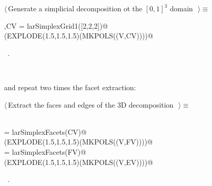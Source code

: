 \documentclass[11pt,oneside]{article}	%
\begin{document}
\begin{flushleft} \small
\begin{minipage}{\linewidth} \label{scrap14}
$\langle\,$Generate a simplicial decomposition ot the $[0,1]^3$ domain\nobreak\ {\footnotesize {}}$\,\rangle\equiv$
\vspace{-1ex}
\begin{list}{}{} \item
\mbox{}\verb@V,CV = larSimplexGrid1([2,2,2])@\\
\mbox{}\verb@VIEW(EXPLODE(1.5,1.5,1.5)(MKPOLS((V,CV))))@\\
\mbox{}\verb@@{\NWsep}
\end{list}
\vspace{-1ex}
\footnotesize\addtolength{\baselineskip}{-1ex}
\begin{list}{}{\setlength{\itemsep}{-\parsep}\setlength{\itemindent}{-\leftmargin}}
\item \NWtxtMacroRefIn\ .
\end{list}
\end{minipage}\\[4ex]
\end{flushleft}

and repeat two times the facet extraction:

\begin{flushleft} \small
\begin{minipage}{\linewidth} \label{scrap15}
$\langle\,$Extract the faces and edges of the 3D decomposition\nobreak\ {\footnotesize {}}$\,\rangle\equiv$
\vspace{-1ex}
\begin{list}{}{} \item
\mbox{}\verb@@\\
\mbox{}\verb@FV = larSimplexFacets(CV)@\\
\mbox{}\verb@VIEW(EXPLODE(1.5,1.5,1.5)(MKPOLS((V,FV))))@\\
\mbox{}\verb@EV = larSimplexFacets(FV)@\\
\mbox{}\verb@VIEW(EXPLODE(1.5,1.5,1.5)(MKPOLS((V,EV))))@\\
\mbox{}\verb@@{\NWsep}
\end{list}
\vspace{-1ex}
\footnotesize\addtolength{\baselineskip}{-1ex}
\begin{list}{}{\setlength{\itemsep}{-\parsep}\setlength{\itemindent}{-\leftmargin}}
\item \NWtxtMacroRefIn\ .
\end{list}
\end{minipage}\\[4ex]
\end{flushleft}
\end{document}
